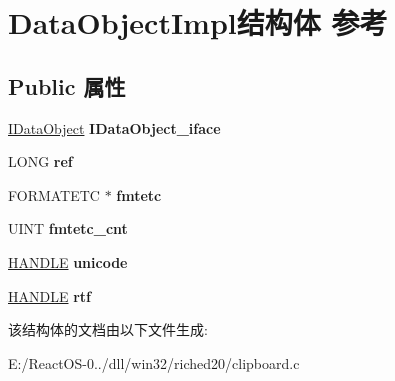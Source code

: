 \hypertarget{struct_data_object_impl}{}\section{Data\+Object\+Impl结构体 参考}
\label{struct_data_object_impl}
\subsection*{Public 属性}
\begin{DoxyCompactItemize}
\item 
\mbox{\label{struct_data_object_impl_ae2ac8131fe82cf757c3429c3d39f8e11}} 
\hyperlink{interface_i_data_object}{I\+Data\+Object} {\bfseries I\+Data\+Object\+\_\+iface}
\item 
\mbox{\label{struct_data_object_impl_a3dc3a97e90996f9641abce1d9304986f}} 
L\+O\+NG {\bfseries ref}
\item 
\mbox{\label{struct_data_object_impl_ac7b6d5778cad41ea4e863d9a2680eec5}} 
F\+O\+R\+M\+A\+T\+E\+TC $\ast$ {\bfseries fmtetc}
\item 
\mbox{\label{struct_data_object_impl_af62c01a0c65729ebf178bb5ac0221db0}} 
U\+I\+NT {\bfseries fmtetc\+\_\+cnt}
\item 
\mbox{\label{struct_data_object_impl_aaab8dc477c1f056ac36888759439ffe8}} 
\hyperlink{interfacevoid}{H\+A\+N\+D\+LE} {\bfseries unicode}
\item 
\mbox{\label{struct_data_object_impl_a6e1ba409e518b41a7a88e07be6282aca}} 
\hyperlink{interfacevoid}{H\+A\+N\+D\+LE} {\bfseries rtf}
\end{DoxyCompactItemize}


该结构体的文档由以下文件生成\+:\begin{DoxyCompactItemize}
\item 
E\+:/\+React\+O\+S-\/0../dll/win32/riched20/clipboard.\+c\end{DoxyCompactItemize}
